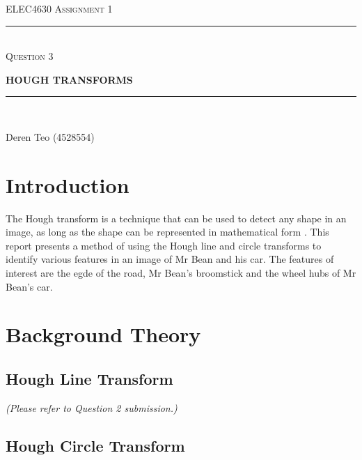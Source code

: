 \begin{titlepage}
  \centering

  \textsc{ELEC4630 Assignment 1}\\
  \vspace{9cm}

  \rule{\linewidth}{0.5pt}\\

  \vspace{1em}
  \LARGE\textsc{Question 3}\\
  \vspace{1em}

  \LARGE\uppercase{\textbf{{Hough Transforms}}}\\

  \rule{\linewidth}{2pt}\\

  \vfill

  \normalsize{Deren Teo (4528554)}
  \vspace{1cm}

\end{titlepage}

\section{Introduction}

The Hough transform is a technique that can be used to detect any shape in an image, as long as the shape can be represented in mathematical form \cite{opencv_hlt}. This report presents a method of using the Hough line and circle transforms to identify various features in an image of Mr Bean and his car. The features of interest are the egde of the road, Mr Bean's broomstick and the wheel hubs of Mr Bean's car.

\section{Background Theory}

\subsection{Hough Line Transform}

\textit{(Please refer to Question 2 submission.)}

\subsection{Hough Circle Transform}

